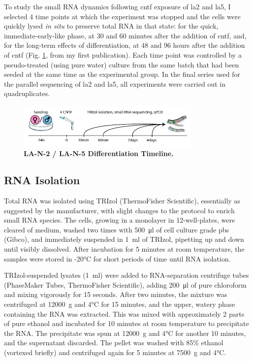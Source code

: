 To study the small RNA dynamics following \ac{cntf} exposure of \ac{la2} and \ac{la5}, I selected 4 time points at which the experiment was stopped and the cells were quickly lysed \textit{in situ} to preserve total RNA in that state: for the quick, immediate-early-like phase, at 30 and 60 minutes after the addition of \ac{cntf}, and, for the long-term effects of differentiation, at 48 and 96 hours after the addition of \ac{cntf} (Fig. \ref{fig:timepoints}, from my first publication\cite{Lobentanzer2019a}). Each time point was controlled by a pseudo-treated (using pure water) culture from the same batch that had been seeded at the same time as the experimental group. In the final series used for the parallel sequencing of \ac{la2} and \ac{la5}, all experiments were carried out in quadruplicates. 

\begin{figure}
\centering
\includegraphics[width=0.8\textwidth]{figures/timepoints}
\caption[LA-N-2 / LA-N-5 Differentiation Timeline.]{\textbf{LA-N-2 / LA-N-5 Differentiation Timeline.}
\label{fig:timepoints}}
\end{figure}

\subsection{RNA Isolation}
Total RNA was isolated using TRIzol (ThermoFisher Scientific), essentially as suggested by the manufacturer, with slight changes to the protocol to enrich small RNA species. The cells, growing in a monolayer in 12-well-plates, were cleared of medium, washed two times with \SI{500}{\micro\litre} of cell culture grade \ac{pbs} (Gibco), and immediately suspended in \SI{1}{\milli\litre} of TRIzol, pipetting up and down until visibly dissolved. After incubation for 5 minutes at room temperature, the samples were stored in -20°C for short periods of time until RNA isolation.

TRIzol-suspended lysates (\SI{1}{\milli\litre}) were added to RNA-separation centrifuge tubes (PhaseMaker Tubes, ThermoFisher Scientific), adding \SI{200}{\micro\litre} of pure chloroform and mixing vigorously for 15 seconds. After two minutes, the mixture was centrifuged at \SI{12000}{\g} and 4°C for 15 minutes, and the upper, watery phase containing the RNA was extracted. This was mixed with approximately 2 parts of pure ethanol and incubated for 10 minutes at room temperature to precipitate the RNA. The precipitate was spun at \SI{12000}{\g} and 4°C for another 10 minutes, and the supernatant discarded. The pellet was washed with 85\% ethanol (vortexed briefly) and centrifuged again for 5 minutes at \SI{7500}{\g} and 4°C.

